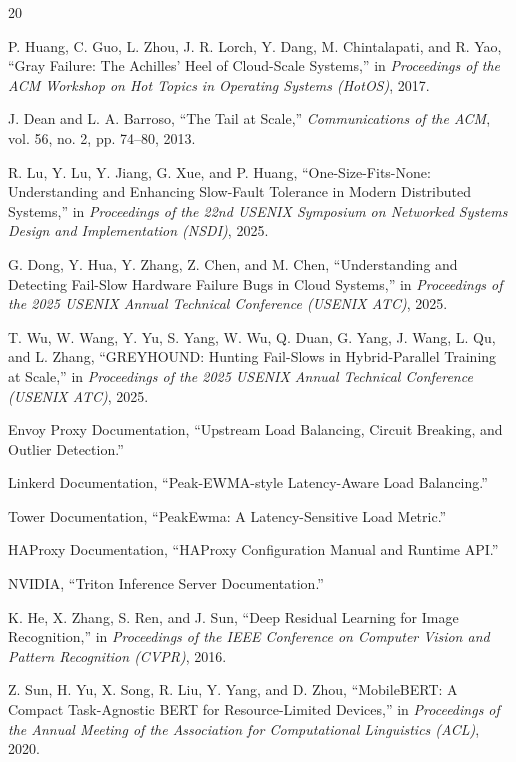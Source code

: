 \documentclass[12pt,conference]{IEEEtran}
\begin{document}
\balance
\begin{thebibliography}{20}

P. Huang, C. Guo, L. Zhou, J. R. Lorch, Y. Dang, M. Chintalapati, and R. Yao,
``Gray Failure: The Achilles' Heel of Cloud-Scale Systems,''
in \emph{Proceedings of the ACM Workshop on Hot Topics in Operating Systems (HotOS)}, 2017.

J. Dean and L. A. Barroso,
``The Tail at Scale,''
\emph{Communications of the ACM}, vol. 56, no. 2, pp. 74--80, 2013.

R. Lu, Y. Lu, Y. Jiang, G. Xue, and P. Huang,
``One-Size-Fits-None: Understanding and Enhancing Slow-Fault Tolerance in Modern Distributed Systems,''
in \emph{Proceedings of the 22nd USENIX Symposium on Networked Systems Design and Implementation (NSDI)}, 2025.

G. Dong, Y. Hua, Y. Zhang, Z. Chen, and M. Chen,
``Understanding and Detecting Fail-Slow Hardware Failure Bugs in Cloud Systems,''
in \emph{Proceedings of the 2025 USENIX Annual Technical Conference (USENIX ATC)}, 2025.

T. Wu, W. Wang, Y. Yu, S. Yang, W. Wu, Q. Duan, G. Yang, J. Wang, L. Qu, and L. Zhang,
``GREYHOUND: Hunting Fail-Slows in Hybrid-Parallel Training at Scale,''
in \emph{Proceedings of the 2025 USENIX Annual Technical Conference (USENIX ATC)}, 2025.

Envoy Proxy Documentation,
``Upstream Load Balancing, Circuit Breaking, and Outlier Detection.''

Linkerd Documentation,
``Peak-EWMA-style Latency-Aware Load Balancing.''

Tower Documentation,
``PeakEwma: A Latency-Sensitive Load Metric.''

HAProxy Documentation,
``HAProxy Configuration Manual and Runtime API.''

NVIDIA,
``Triton Inference Server Documentation.''

K. He, X. Zhang, S. Ren, and J. Sun,
``Deep Residual Learning for Image Recognition,''
in \emph{Proceedings of the IEEE Conference on Computer Vision and Pattern Recognition (CVPR)}, 2016.

Z. Sun, H. Yu, X. Song, R. Liu, Y. Yang, and D. Zhou,
``MobileBERT: A Compact Task-Agnostic BERT for Resource-Limited Devices,''
in \emph{Proceedings of the Annual Meeting of the Association for Computational Linguistics (ACL)}, 2020.


\end{thebibliography}
\end{document}
